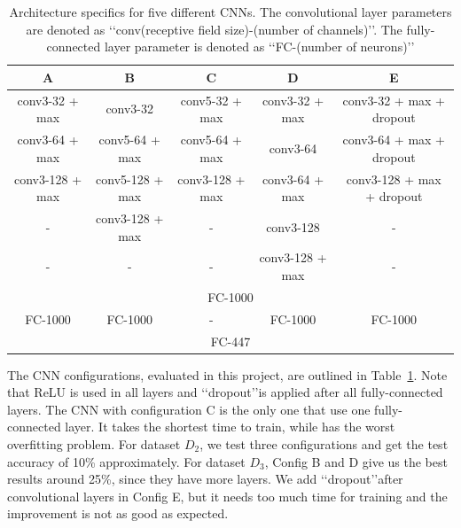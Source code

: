 \begin{table}[H]
	\begin{center}
	\begin{tabular}{|c|c|c|c|c|}
	\hline
	A & B & C & D & E \\
	\hline
	conv3-32 + max & conv3-32 & conv5-32 + max & conv3-32 + max & conv3-32 + max + dropout \\
	\hline
	conv3-64 + max & conv5-64 + max & conv5-64 + max & conv3-64 & conv3-64 + max + dropout \\
	\hline
	conv3-128 + max & conv5-128 + max & conv3-128 + max & conv3-64 + max & conv3-128 + max + dropout \\
	\hline
	- & conv3-128 + max & - & conv3-128 & - \\
	\hline
	- & - & - & conv3-128 + max & - \\
	\hline
	\multicolumn{5}{|c|}{FC-1000}\\
	\hline
	FC-1000 & FC-1000 & - & FC-1000 & FC-1000 \\
	\hline
	\multicolumn{5}{|c|}{FC-447}\\
	\hline
	\end{tabular}
	\end{center}
	\caption{Architecture specifics for five different CNNs. The convolutional layer parameters are denoted as \lq\lq conv(receptive field size)-(number of channels)\rq\rq. The fully-connected layer parameter is denoted as \lq\lq FC-(number of neurons)\rq\rq}
	\label{cnn_table}
\end{table}

The CNN configurations, evaluated in this project, are outlined in Table~\ref{cnn_table}. Note that ReLU is used in all layers and \lq\lq dropout\rq\rq is applied after all fully-connected layers. The CNN with configuration C is the only one that use one fully-connected layer. It takes the shortest time to train, while has the worst overfitting problem. For dataset $D_{2}$, we test three configurations and get the test accuracy of 10\% approximately. For dataset $D_{3}$, Config B and D give us the best results around 25\%, since they have more layers. We add \lq\lq dropout\rq\rq after convolutional layers in Config E, but it needs too much time for training and the improvement is not as good as expected.

